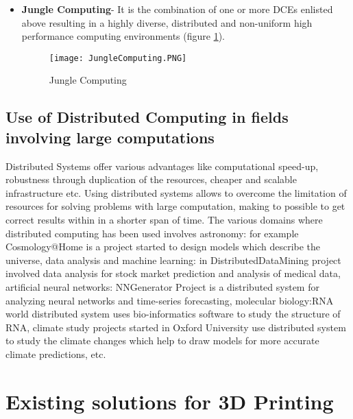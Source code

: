 \begin{itemize}
\item \textbf{Jungle Computing}- It is the combination of one or more DCEs enlisted above resulting in a highly diverse, distributed and non-uniform high performance computing environments (figure \ref{fig:JungleComputing}).  

\begin{figure}[ht!]
\centering
\texttt{[image: JungleComputing.PNG]}
\caption{Jungle Computing}
\label{fig:JungleComputing}
\end{figure}
\end{itemize}

\subsection{Use of Distributed Computing in fields involving large computations}

Distributed Systems offer various advantages like computational speed-up, robustness through duplication of the resources, cheaper and scalable infrastructure etc. 
Using distributed systems allows to overcome the limitation of resources for solving problems with large computation, making to possible to get correct results within in a shorter span of time. The various domains where distributed computing has been used involves astronomy: for example Cosmology@Home is a project started to design models which describe the universe, data analysis and machine learning: in DistributedDataMining project involved data analysis for stock market prediction and analysis of medical data, artificial neural networks: NNGenerator Project is a distributed system for analyzing neural networks and time-series forecasting, molecular biology:RNA world distributed system uses bio-informatics software to study the structure of RNA, climate study projects started in Oxford University use distributed system to study the climate changes which help to draw models for more accurate climate predictions, etc.  

\section{Existing solutions for 3D Printing}

